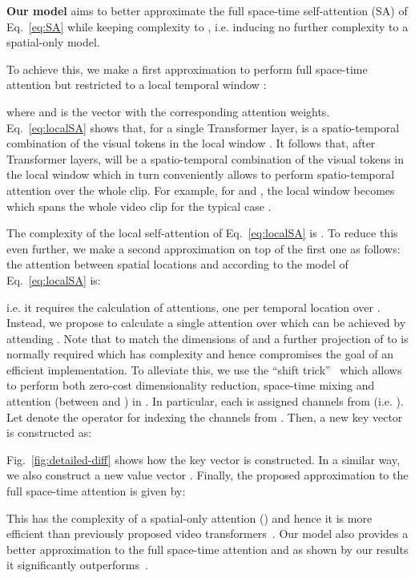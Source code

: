 \documentclass{article}
\begin{document}
\textbf{Our model} aims to better approximate the full space-time self-attention (SA) of Eq.~\ref{eq:SA} while keeping complexity to , i.e. inducing no further complexity to a spatial-only model. 

To achieve this, we make a first approximation to perform full space-time attention but restricted to a local temporal window :  

where  and  is the vector with the corresponding attention weights. Eq.~\ref{eq:localSA} shows that, for a single Transformer layer,  is a spatio-temporal combination of the visual tokens in the local window . It follows that, after  Transformer layers,  will be a spatio-temporal combination of the visual tokens in the local window  which in turn conveniently allows to perform spatio-temporal attention over the whole clip. For example, for  and , the local window becomes  which spans the whole video clip for the typical case .

The complexity of the local self-attention of Eq.~\ref{eq:localSA} is . To reduce this even further, we make a second approximation on top of the first one as follows: the attention between spatial locations  and  according to the model of Eq.~\ref{eq:localSA} is:

i.e. it requires the calculation of  attentions, one per temporal location over . Instead, we propose to calculate a single attention over  which can be achieved by  attending . Note that to match the dimensions of  and  a further projection of  to  is normally required which has complexity  and hence compromises the goal of an efficient implementation. To alleviate this, we use the ``shift trick''~\cite{wu2018shift, lin2019tsm} which allows to perform both zero-cost dimensionality reduction, space-time mixing and attention (between  and  ) in . In particular, each  is assigned  channels from  (i.e. ). Let  denote the operator for indexing the  channels from . Then, a new key vector is constructed as:

Fig.~\ref{fig:detailed-diff} shows how the key vector  is constructed. In a similar way, we also construct a new value vector . Finally, the proposed approximation to the full space-time attention is given by: 

This has the complexity of a spatial-only attention () and hence it is more efficient than previously proposed video transformers~\cite{bertasius2021space, arnab2021vivit}. Our model also provides a better approximation to the full space-time attention and as shown by our results it significantly outperforms~\cite{bertasius2021space, arnab2021vivit}.   
\end{document}
